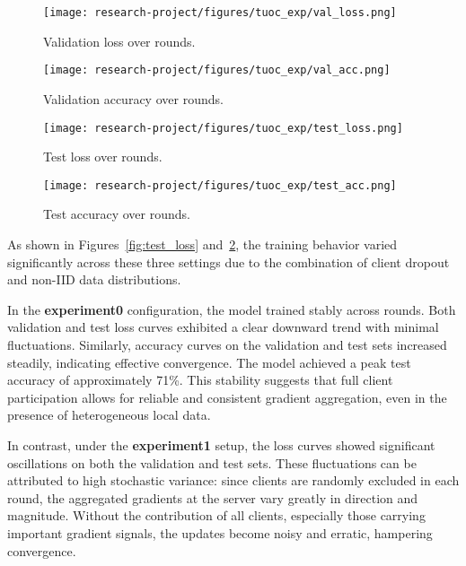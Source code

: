 \documentclass[12pt, a4paper]{article}
\begin{document}
\begin{figure}[H]
    \centering
    \begin{minipage}[b]{0.48\textwidth}
        \centering
        \texttt{[image: research-project/figures/tuoc\_exp/val\_loss.png]}
        \caption{Validation loss over rounds.}
        \label{fig:val_loss}
    \end{minipage}
    \hfill
    \begin{minipage}[b]{0.48\textwidth}
        \centering
        \texttt{[image: research-project/figures/tuoc\_exp/val\_acc.png]}
        \caption{Validation accuracy over rounds.}
        \label{fig:val_acc}
    \end{minipage}
\end{figure}

\begin{figure}[H]
    \centering
    \begin{minipage}[b]{0.48\textwidth}
        \centering
        \texttt{[image: research-project/figures/tuoc\_exp/test\_loss.png]}
        \caption{Test loss over rounds.}
        \label{fig:test_loss}
    \end{minipage}
    \hfill
    \begin{minipage}[b]{0.48\textwidth}
        \centering
        \texttt{[image: research-project/figures/tuoc\_exp/test\_acc.png]}
        \caption{Test accuracy over rounds.}
        \label{fig:test_acc}
    \end{minipage}
\end{figure}


As shown in Figures~\ref{fig:test_loss} and~\ref{fig:test_acc}, the training behavior varied significantly across these three settings due to the combination of client dropout and non-IID data distributions.

In the \textbf{experiment0} configuration, the model trained stably across rounds. Both validation and test loss curves exhibited a clear downward trend with minimal fluctuations. Similarly, accuracy curves on the validation and test sets increased steadily, indicating effective convergence. The model achieved a peak test accuracy of approximately 71\%. This stability suggests that full client participation allows for reliable and consistent gradient aggregation, even in the presence of heterogeneous local data.

In contrast, under the \textbf{experiment1} setup, the loss curves showed significant oscillations on both the validation and test sets. These fluctuations can be attributed to high stochastic variance: since clients are randomly excluded in each round, the aggregated gradients at the server vary greatly in direction and magnitude. Without the contribution of all clients, especially those carrying important gradient signals, the updates become noisy and erratic, hampering convergence.
\end{document}
